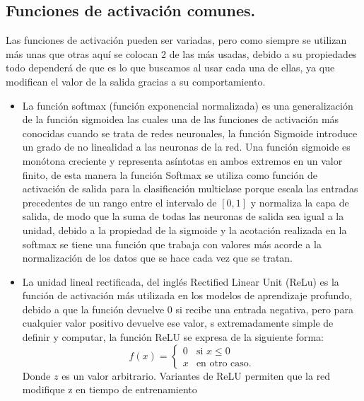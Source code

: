 \documentclass[a4paper, 12pt]{article}
\begin{document}
    \subsection{Funciones de activación comunes.}
    Las funciones de activación pueden ser variadas, pero como siempre se utilizan más unas que otras aquí se colocan 2 de las más usadas, debido a su propiedades todo dependerá de que es lo que buscamos al usar cada una de ellas, ya que modifican el valor de la salida gracias a su comportamiento.
    \begin{itemize}
    \item La función softmax (función exponencial normalizada) es una generalización de la función sigmoidea las cuales una de las funciones de activación más conocidas cuando se trata de redes neuronales, la función Sigmoide introduce un grado de no linealidad a las neuronas de la red. Una función sigmoide es monótona creciente y representa asíntotas en ambos extremos en un valor finito, de esta manera la función Softmax se utiliza como función de activación de salida para la clasificación multiclase porque escala las entradas precedentes de un rango entre el intervalo de $[0,1]$ y normaliza la capa de salida, de modo que la suma de todas las neuronas de salida sea igual a la unidad, debido a la propiedad de la sigmoide y la acotación realizada en la softmax se tiene una función que trabaja con valores más acorde a la normalización de los datos que se hace cada vez que se tratan.
    \item La unidad lineal rectificada, del inglés Rectified Linear Unit (ReLu) es la función de activación más utilizada en los modelos de aprendizaje profundo, debido a que la función devuelve 0 si recibe una entrada negativa, pero para cualquier valor positivo devuelve ese valor, s extremadamente simple de definir y computar, la función ReLU se expresa de la siguiente forma:
    \[
    f(x) =
    \begin{cases}
        0 & \text{si } x\leq 0\\
        x & \text{en otro caso}.
    \end{cases}
    \]
    Donde $z$ es un valor arbitrario. Variantes de ReLU permiten que la red modifique z en tiempo de entrenamiento  
    \end{itemize}
\end{document}

